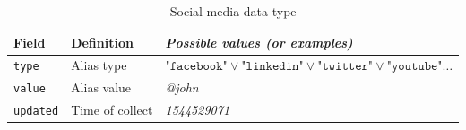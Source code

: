 \documentclass[twoside,twocolumn]{article}
\theoremstyle{definition}
\theoremstyle{remark}
\begin{document}
\begin{table}[htb]
    \centering
    \caption{Social media data type}
    \begin{tabular*}{0.9\textwidth}{l|l||l}
        Field & Definition & \textit{Possible values (or examples)} \\
        \hline \hline
        \texttt{type} & Alias type & $\texttt{"facebook"} \vee \texttt{"linkedin"} \vee \texttt{"twitter"} \vee \texttt{"youtube"} \dots$ \\
        \hline
        \texttt{value} & Alias value & \textit{@john} \\
        \hline
        \texttt{updated} & Time of collect & \textit{1544529071}
        \label{table:socials}
    \end{tabular*}
\end{table}
\end{document}
